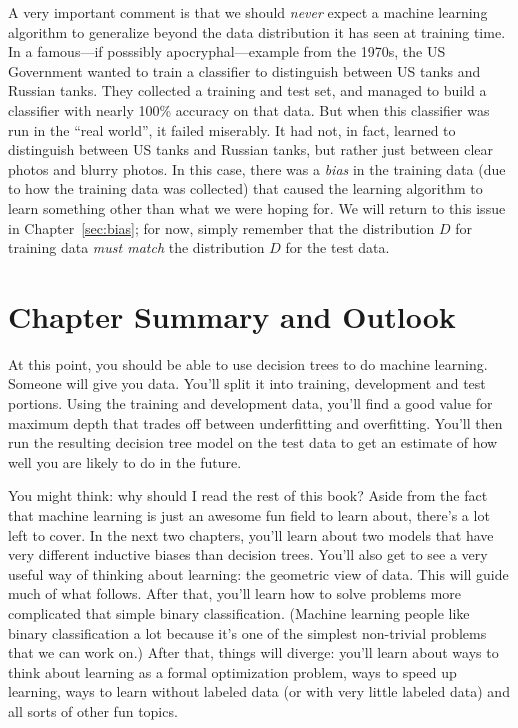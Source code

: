A very important comment is that we should \emph{never} expect a machine learning algorithm to generalize beyond the data distribution it has seen at training time.
In a famous---if posssibly apocryphal---example from the 1970s, the US Government wanted to train a classifier to distinguish between US tanks and Russian tanks.
They collected a training and test set, and managed to build a classifier with nearly 100\% accuracy on that data.
But when this classifier was run in the ``real world'', it failed miserably.
It had not, in fact, learned to distinguish between US tanks and Russian tanks, but rather just between clear photos and blurry photos.
In this case, there was a \emph{bias} in the training data (due to how the training data was collected) that caused the learning algorithm to learn something other than what we were hoping for.
We will return to this issue in Chapter~\ref{sec:bias}; for now, simply remember that the distribution $D$ for training data \emph{must match} the distribution $D$ for the test data.



\section{Chapter Summary and Outlook}

At this point, you should be able to use decision trees to do machine
learning.  Someone will give you data.  You'll split it into
training, development and test portions.  Using the training and
development data, you'll find a good value for maximum depth that
trades off between underfitting and overfitting.  You'll then run the
resulting decision tree model on the test data to get an estimate of
how well you are likely to do in the future.

You might think: why should I read the rest of this book?  Aside from
the fact that machine learning is just an awesome fun field to learn
about, there's a lot left to cover.  In the next two chapters, you'll
learn about two models that have very different inductive biases than
decision trees.  You'll also get to see a very useful way of thinking
about learning: the geometric view of data.  This will guide much of
what follows.  After that, you'll learn how to solve problems more
complicated that simple binary classification.  (Machine learning
people like binary classification a lot because it's one of the
simplest non-trivial problems that we can work on.)  After that,
things will diverge: you'll learn about ways to think about learning
as a formal optimization problem, ways to speed up learning, ways to
learn without labeled data (or with very little labeled data) and all
sorts of other fun topics.

